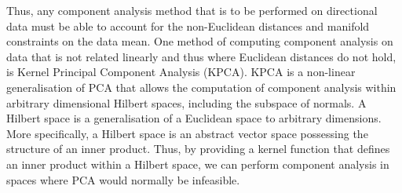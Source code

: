 \begin{figure}[t]
\begin{minipage}[t]{.45\textwidth}
\label{fig:singl_img_united_nations}
	\end{minipage}
\end{figure}
Thus, any component analysis method that is to be performed on directional data
must be able to account for the non-Euclidean distances and manifold constraints
on the data mean. One method of computing component analysis on data that is
not related linearly and thus where Euclidean distances do not hold, is
Kernel Principal Component Analysis (KPCA).
KPCA is a non-linear generalisation of PCA that allows the computation
of component analysis within arbitrary dimensional Hilbert spaces,
including the subspace of normals. A Hilbert space is a generalisation
of a Euclidean space to arbitrary dimensions. More specifically, a Hilbert
space is an abstract vector space possessing the structure of an inner
product. Thus, by providing a kernel function that defines
an inner product within a Hilbert space, we can perform component analysis in
spaces where PCA would normally be infeasible.


